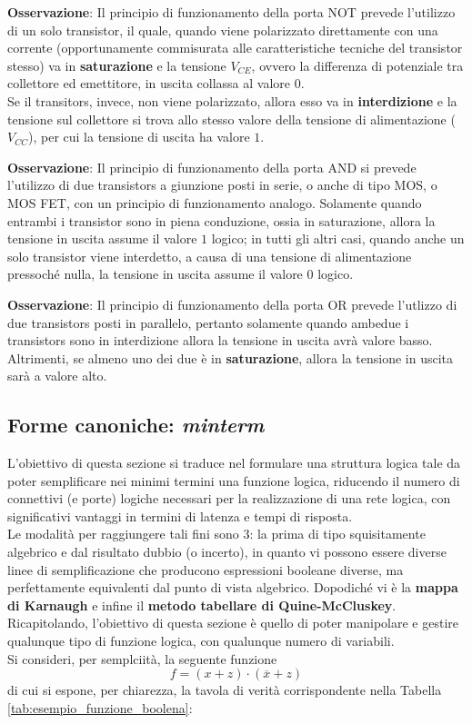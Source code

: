 \documentclass[a4paper]{extarticle}
\begin{document}
\vspace{1em}
\noindent
\textbf{Osservazione}: Il principio di funzionamento della porta NOT prevede l'utilizzo di un solo transistor, il quale, quando viene polarizzato direttamente con una corrente (opportunamente commisurata alle caratteristiche tecniche del transistor stesso) va in \textbf{saturazione} e la tensione \(V_{CE}\), ovvero la differenza di potenziale tra collettore ed emettitore, in uscita collassa al valore \(0\).\\
Se il transitors, invece, non viene polarizzato, allora esso va in \textbf{interdizione} e la tensione sul collettore si trova allo stesso valore della tensione di alimentazione (\(V_{CC}\)), per cui la tensione di uscita ha valore \(1\).

\vspace{1em}
\noindent
\textbf{Osservazione}: Il principio di funzionamento della porta AND si prevede l'utilizzo di due transistors a giunzione posti in serie, o anche di tipo MOS, o MOS FET, con un principio di funzionamento analogo. Solamente quando entrambi i transistor sono in piena conduzione, ossia in saturazione, allora la tensione in uscita assume il valore \(1\) logico; in tutti gli altri casi, quando anche un solo transistor viene interdetto, a causa di una tensione di alimentazione pressoché nulla, la tensione in uscita assume il valore \(0\) logico.

\vspace{1em}
\noindent
\textbf{Osservazione}: Il principio di funzionamento della porta OR prevede l'utlizzo di due transistors posti in parallelo, pertanto solamente quando ambedue i transistors sono in interdizione allora la tensione in uscita avrà valore basso.\\
Altrimenti, se almeno uno dei due è in \textbf{saturazione}, allora la tensione in uscita sarà a valore alto.

\subsection{Forme canoniche: \textit{minterm}}
L'obiettivo di questa sezione si traduce nel formulare una struttura logica tale da poter semplificare nei minimi termini una funzione logica, riducendo il numero di connettivi (e porte) logiche necessari per la realizzazione di una rete logica, con significativi vantaggi in termini di latenza e tempi di risposta.\\
Le modalità per raggiungere tali fini sono \(3\): la prima di tipo squisitamente algebrico e dal risultato dubbio (o incerto), in quanto vi possono essere diverse linee di semplificazione che producono espressioni booleane diverse, ma perfettamente equivalenti dal punto di vista algebrico. Dopodiché vi è la \textbf{mappa di Karnaugh} e infine il \textbf{metodo tabellare di Quine-McCluskey}.\\
Ricapitolando, l'obiettivo di questa sezione è quello di poter manipolare e gestire qualunque tipo di funzione logica, con qualunque numero di variabili.\\
Si consideri, per semplciità, la seguente funzione
\[f = (x + z) \cdot (\overline{x} + z)\]
di cui si espone, per chiarezza, la tavola di verità corrispondente nella Tabella \ref{tab:esempio_funzione_boolena}:
\end{document}
